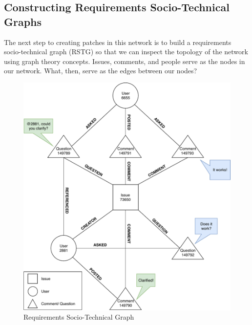 \documentclass[conference]{IEEEtran}
\begin{document}

\subsection{Constructing Requirements Socio-Technical Graphs}
The next step to creating patches in this network is to build a requirements socio-technical graph (RSTG) so that we can inspect the topology of the network using graph theory concepts. Issues, comments, and people serve as the nodes in our network. What, then, serve as the edges between our nodes?

\begin{figure}
	\centering
	\includegraphics[width=\linewidth]{img/rstg.pdf}
	\caption{Requirements Socio-Technical Graph}
	\label{fig:rstg}
\end{figure}
\end{document}
